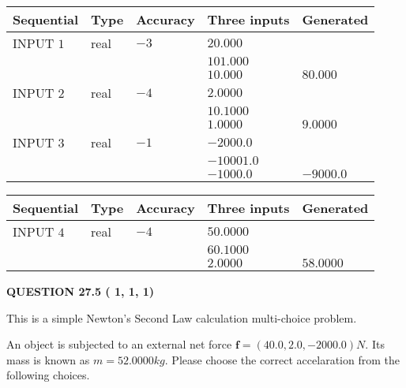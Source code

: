 \documentclass[12pt]{article}
\begin{document}
  
\noindent\begin{tabular}{|l|l|l|l|l|}
\hline
 Sequential & Type & Accuracy & Three inputs & Generated \\ 
\hline
 
 
  INPUT $           1$ & real & $          -3 $ & $
 20.000
  $ & \\
  & & &  $
 101.000
  $ & \\
  & & &  $
 10.000
 $ & $ 80.000 $ 
 \\  \hline  
 
 
  INPUT $           2$ & real & $          -4 $ & $
 2.0000
  $ & \\
  & & &  $
 10.1000
  $ & \\
  & & &  $
 1.0000
 $ & $ 9.0000 $ 
 \\  \hline  
 
 
  INPUT $           3$ & real & $          -1 $ & $
 -2000.0
  $ & \\
  & & &  $
 -10001.0
  $ & \\
  & & &  $
 -1000.0
 $ & $ -9000.0 $ 
 \\  \hline  
 \end{tabular}
   
   
  
  
\noindent\begin{tabular}{|l|l|l|l|l|}
\hline
 Sequential & Type & Accuracy & Three inputs & Generated \\ 
\hline
 
 
  INPUT $           4$ & real & $          -4 $ & $
 50.0000
  $ & \\
  & & &  $
 60.1000
  $ & \\
  & & &  $
 2.0000
 $ & $ 58.0000 $ 
 \\  \hline  
 \end{tabular}
   
   
  
\vspace{0.2in}
  
{\textbf{\Large{QUESTION
27.5 
 (          1,          1,          1)
}}}
  
  


\noindent{}
This is a simple Newton's Second Law calculation multi-choice problem.  
\noindent{}


 
 
An object is subjected to an external net force $\mathbf{f}=
(40.0 , 2.0 , -2000.0) N$.
Its mass is known as $m= %
52.0000 kg$. Please choose the
correct accelaration from the following choices.
 
\end{document}
